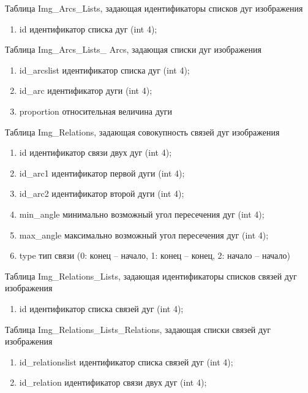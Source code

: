 \noindent 
Таблица Img\_Arcs\_Lists, задающая идентификаторы списков дуг изображения
\small
\begin{enumerate}
\item id			идентификатор списка дуг (int 4);
\end{enumerate}
\normalsize


\noindent 
Таблица Img\_Arcs\_Lists\_ Arcs, задающая списки дуг изображения
\small
\begin{enumerate}
\item id\_arcslist		идентификатор списка дуг (int 4);
\item id\_arc		идентификатор дуги (int 4);
\item proportion		относительная величина дуги		
\end{enumerate}
\normalsize


\noindent 
Таблица Img\_Relations, задающая совокупность связей дуг изображения
\small
\begin{enumerate}
\item id			идентификатор связи двух дуг (int 4);
\item id\_arc1                 	идентификатор первой дуги (int 4);
\item id\_arc2                 	идентификатор второй дуги (int 4);
\item min\_angle           	минимально возможный угол пересечения дуг (int 4);
\item max\_angle          	максимально возможный угол пересечения дуг (int 4);
\item type			тип связи (0: конец – начало, 1: конец – конец, 2: начало – начало)
\end{enumerate}
\normalsize


\noindent 
Таблица Img\_Relations\_Lists, задающая идентификаторы списков связей дуг изображения
\small
\begin{enumerate}
\item id			идентификатор списка связей дуг (int 4);
\end{enumerate}
\normalsize


\noindent 
Таблица Img\_Relations\_Lists\_Relations, задающая списки связей дуг изображения
\small
\begin{enumerate}
\item id\_relationslist	идентификатор списка связей дуг (int 4);
\item id\_relation		идентификатор связи двух дуг (int 4);
\end{enumerate}
\normalsize


